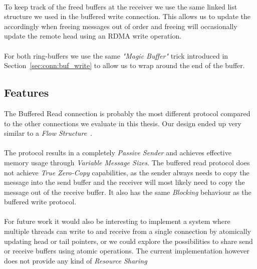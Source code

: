 \paragraph{} To keep track of the freed buffers at the receiver we use the same linked list structure we used in the buffered
write connection. This allows us to update the  accordingly when freeing messages out of order and freeing will
occasionally update the remote head using an RDMA write operation.

\paragraph{} For both ring-buffers we use the same \emph{"Magic Buffer"} trick introduced in Section~\ref{sec:conn:buf_write} to 
allow us to wrap around the end of the buffer.

\subsection{Features}
The Buffered Read connection is probably the most different protocol compared to the other connections we evaluate in this
thesis. Our design ended up very similar to a \emph{Flow Structure}~\cite{sharma2020design}.

\paragraph{} The protocol results in a completely \emph{Passive Sender} and achieves effective memory usage through \emph{Variable Message Sizes}.
The buffered read protocol does not achieve \emph{True Zero-Copy} capabilities, as the sender always needs to copy the 
message into the send buffer and the receiver will most likely need to copy the message out of the receive buffer. It also
has the same \emph{Blocking} behaviour as the buffered write protocol.


\paragraph{} For future work it would also be interesting to implement a system where multiple threads can write to and receive 
from a single  connection by atomically updating head or tail pointers, or we could explore the possibilities to share send or
receive buffers using atomic operations. The current implementation however does not provide any kind of \emph{Resource Sharing}
